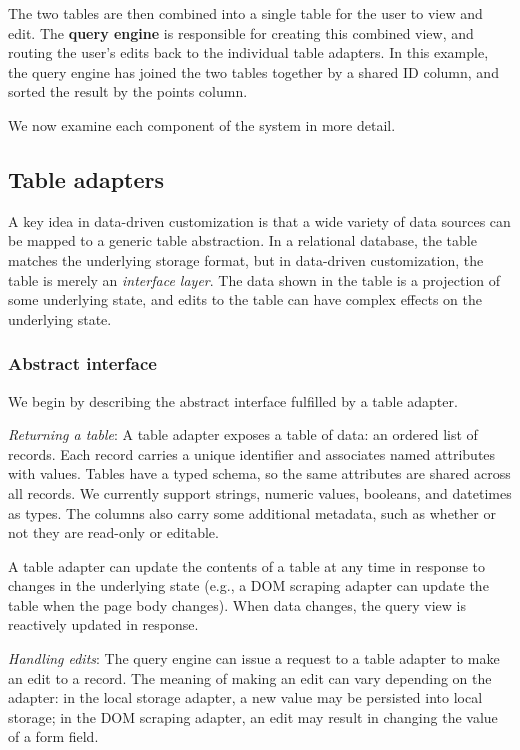 \documentclass[sigplan,screen,10pt,anonymous,review]{acmart}
\begin{document}
The two tables are then combined into a single table for the user to
view and edit. The \textbf{query engine} is responsible for creating
this combined view, and routing the user's edits back to the individual
table adapters. In this example, the query engine has joined the two
tables together by a shared ID column, and sorted the result by the
points column.

We now examine each component of the system in more detail.

\hypertarget{table-adapters}{%
\subsection{Table adapters}\label{table-adapters}}

A key idea in data-driven customization is that a wide variety of data
sources can be mapped to a generic table abstraction. In a relational
database, the table matches the underlying storage format, but in
data-driven customization, the table is merely an \emph{interface
layer}. The data shown in the table is a projection of some underlying
state, and edits to the table can have complex effects on the underlying
state.

\hypertarget{abstract-interface}{%
\subsubsection{Abstract interface}\label{abstract-interface}}

We begin by describing the abstract interface fulfilled by a table
adapter.

\emph{Returning a table}: A table adapter exposes a table of data: an
ordered list of records. Each record carries a unique identifier and
associates named attributes with values. Tables have a typed schema, so
the same attributes are shared across all records. We currently support
strings, numeric values, booleans, and datetimes as types. The columns
also carry some additional metadata, such as whether or not they are
read-only or editable.

A table adapter can update the contents of a table at any time in
response to changes in the underlying state (e.g., a DOM scraping
adapter can update the table when the page body changes). When data
changes, the query view is reactively updated in response.

\emph{Handling edits}: The query engine can issue a request to a table
adapter to make an edit to a record. The meaning of making an edit can
vary depending on the adapter: in the local storage adapter, a new value
may be persisted into local storage; in the DOM scraping adapter, an
edit may result in changing the value of a form field.
\end{document}
